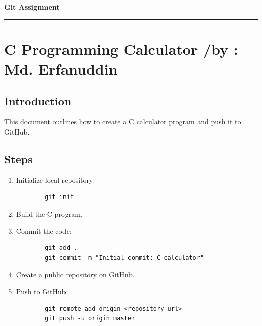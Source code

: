 \documentclass[12pt,a4paper]{article}
\begin{document}
\begin{titlepage}
		\vfill
		
		\Large\textbf{\color{orange}Git Assignment}\\
		
		\vspace{1.5cm}
		\noindent\rule{\textwidth}{1pt}
		
	\end{titlepage}


	
	\newpage
	\tableofcontents
	
\newpage
\section{C Programming Calculator /by : Md. Erfanuddin}
\subsection{Introduction}
This document outlines how to create a C calculator program and push it to GitHub.

\subsection{Steps}
\begin{enumerate}
    \item Initialize local repository:
    \begin{verbatim}
        git init
    \end{verbatim}
    \item Build the C program.
    \item Commit the code:
    \begin{verbatim}
        git add .
        git commit -m "Initial commit: C calculator"
    \end{verbatim}
    \item Create a public repository on GitHub.
    \item Push to GitHub:
    \begin{verbatim}
        git remote add origin <repository-url>
        git push -u origin master
    \end{verbatim}
\end{enumerate}
\end{document}
